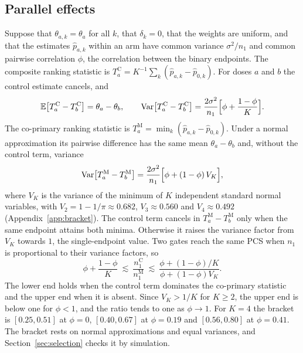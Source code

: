\subsection{Parallel effects}
Suppose that $\theta_{a,k}=\theta_a$ for all $k$, that $\delta_k=0$, that the weights are uniform, and that the estimates $\hat p_{a,k}$ within an arm have common variance $\sigma^2/n_1$ and common pairwise correlation $\phi$, the correlation between the binary endpoints. The composite ranking statistic is $T^{\mathrm{C}}_a=K^{-1}\sum_k(\hat p_{a,k}-\hat p_{0,k})$. For doses $a$ and $b$ the control estimate cancels, and
\begin{equation*}
\mathbb{E}\big[T^{\mathrm{C}}_a-T^{\mathrm{C}}_b\big]=\theta_a-\theta_b,\qquad
\mathrm{Var}\big[T^{\mathrm{C}}_a-T^{\mathrm{C}}_b\big]=\frac{2\sigma^2}{n_1}\Big[\phi+\frac{1-\phi}{K}\Big].
\end{equation*}
The co-primary ranking statistic is $T^{\mathrm{M}}_a=\min_k(\hat p_{a,k}-\hat p_{0,k})$. Under a normal approximation its pairwise difference has the same mean $\theta_a-\theta_b$ and, without the control term, variance
\begin{equation*}
\mathrm{Var}\big[T^{\mathrm{M}}_a-T^{\mathrm{M}}_b\big]=\frac{2\sigma^2}{n_1}\Big[\phi+(1-\phi)\,V_K\Big],
\end{equation*}
where $V_K$ is the variance of the minimum of $K$ independent standard normal variables, with $V_2=1-1/\pi\approx0.682$, $V_3\approx0.560$ and $V_4\approx0.492$ (Appendix~\ref{app:bracket}). The control term cancels in $T^{\mathrm{M}}_a-T^{\mathrm{M}}_b$ only when the same endpoint attains both minima. Otherwise it raises the variance factor from $V_K$ towards $1$, the single-endpoint value. Two gates reach the same PCS when $n_1$ is proportional to their variance factors, so
\begin{equation}\label{eq:bracket}
\phi+\frac{1-\phi}{K}\ \lesssim\ \frac{n_1^{\mathrm{C}}}{n_1^{\mathrm{M}}}\ \lesssim\ \frac{\phi+(1-\phi)/K}{\phi+(1-\phi)V_K}.
\end{equation}
The lower end holds when the control term dominates the co-primary statistic and the upper end when it is absent. Since $V_K>1/K$ for $K\ge2$, the upper end is below one for $\phi<1$, and the ratio tends to one as $\phi\to1$. For $K=4$ the bracket is $[0.25,0.51]$ at $\phi=0$, $[0.40,0.67]$ at $\phi=0.19$ and $[0.56,0.80]$ at $\phi=0.41$. The bracket rests on normal approximations and equal variances, and Section~\ref{sec:selection} checks it by simulation.

